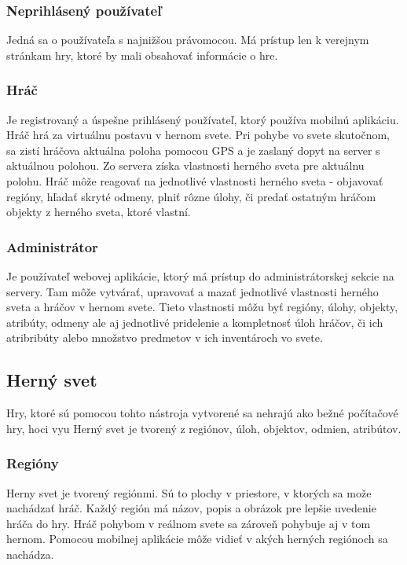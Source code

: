 \subsubsection{Neprihlásený používateľ}
Jedná sa o používateľa s najnižšou právomocou. Má prístup len k verejnym stránkam hry, ktoré by mali obsahovať informácie o hre.

\subsubsection{Hráč}
Je registrovaný a úspešne prihlásený používateľ, ktorý používa mobilnú aplikáciu. Hráč hrá za virtuálnu postavu v hernom svete. Pri pohybe vo svete skutočnom, sa zistí hráčova aktuálna poloha pomocou GPS a je zaslaný dopyt na server s aktuálnou polohou. Zo servera získa vlastnosti herného sveta pre aktuálnu polohu. Hráč môže reagovať na jednotlivé vlastnosti herného sveta - objavovať regióny, hľadať skryté odmeny, plniť rôzne úlohy, či predať ostatným hráčom objekty z herného sveta, ktoré vlastní.

\subsubsection{Administrátor}
Je používateľ webovej aplikácie, ktorý má prístup do administrátorskej sekcie na servery. Tam môže vytvárať, upravovať a mazať jednotlivé vlastnosti herného sveta a hráčov v hernom svete. Tieto vlastnosti môžu byť regióny, úlohy, objekty, atribúty, odmeny ale aj jednotlivé pridelenie a kompletnosť úloh hráčov, či ich atribribúty alebo množstvo predmetov v ich inventároch   vo svete. 

\subsection{Herný svet}
Hry, ktoré sú pomocou tohto nástroja vytvorené sa nehrajú ako bežné počítačové hry, hoci vyu
Herný svet je tvorený z regiónov, úloh, objektov, odmien, atribútov.

\subsubsection{Regióny}
Herny svet je tvorený regiónmi. Sú to plochy v priestore, v ktorých sa može nachádzať hráč. Každý región má názov, popis a obrázok pre lepšie uvedenie hráča do hry. Hráč pohybom v reálnom svete sa zároveň pohybuje aj v tom hernom. Pomocou mobilnej aplikácie môže vidieť v akých herných regiónoch sa nachádza.

